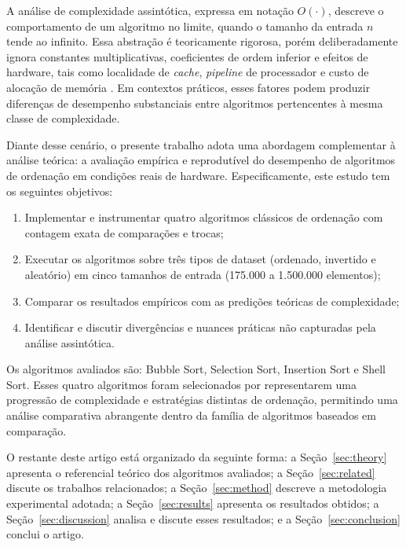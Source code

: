 \documentclass[12pt]{article}
\begin{document}
A análise de complexidade assintótica, expressa em notação
$O(\cdot)$, descreve o comportamento de um algoritmo no limite,
quando o tamanho da entrada $n$ tende ao infinito. Essa
abstração é teoricamente rigorosa, porém deliberadamente ignora
constantes multiplicativas, coeficientes de ordem inferior e
efeitos de hardware, tais como localidade de \textit{cache},
\textit{pipeline} de processador e custo de alocação de memória
\cite{knuth1998}. Em contextos práticos, esses fatores podem
produzir diferenças de desempenho substanciais entre algoritmos
pertencentes à mesma classe de complexidade.

Diante desse cenário, o presente trabalho adota uma abordagem
complementar à análise teórica: a avaliação empírica e
reprodutível do desempenho de algoritmos de ordenação em
condições reais de hardware. Especificamente, este estudo tem
os seguintes objetivos:

\begin{enumerate}
  \item Implementar e instrumentar quatro algoritmos clássicos
        de ordenação com contagem exata de comparações e trocas;
  \item Executar os algoritmos sobre três tipos de dataset
        (ordenado, invertido e aleatório) em cinco tamanhos de
        entrada (175.000 a 1.500.000 elementos);
  \item Comparar os resultados empíricos com as predições
        teóricas de complexidade;
  \item Identificar e discutir divergências e nuances práticas
        não capturadas pela análise assintótica.
\end{enumerate}

Os algoritmos avaliados são: Bubble Sort, Selection Sort,
Insertion Sort e Shell Sort. Esses quatro algoritmos foram
selecionados por representarem uma progressão de complexidade
e estratégias distintas de ordenação, permitindo uma análise
comparativa abrangente dentro da família de algoritmos
baseados em comparação.

O restante deste artigo está organizado da seguinte forma:
a Seção~\ref{sec:theory} apresenta o referencial teórico dos
algoritmos avaliados; a Seção~\ref{sec:related} discute os
trabalhos relacionados; a Seção~\ref{sec:method} descreve a
metodologia experimental adotada; a Seção~\ref{sec:results}
apresenta os resultados obtidos; a Seção~\ref{sec:discussion}
analisa e discute esses resultados; e a Seção~\ref{sec:conclusion}
conclui o artigo.
\end{document}
